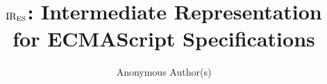 \documentclass[11pt,anonymous]{article}
\begin{document}


\title{\( \text{IR}_\text{ES} \): Intermediate Representation for ECMAScript Specifications}

\author{Anonymous Author(s)}

\date{}
\maketitle



\end{document}
